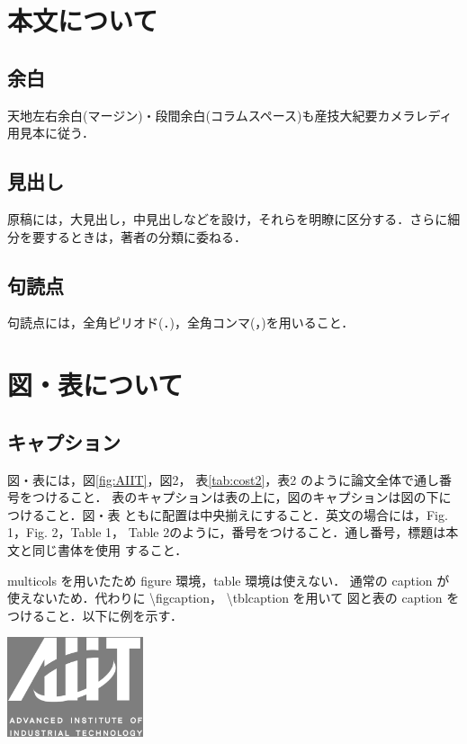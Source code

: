 \documentclass[a4j,twoside]{jarticle}
\begin{document}
\begin{multicols}{2}
\section{本文について}

\subsection{余白}
天地左右余白(マージン)・段間余白(コラムスペース)も産技大紀要カメラレディ用見本に従う．

\subsection{見出し}
原稿には，大見出し，中見出しなどを設け，それらを明瞭に区分する．さらに細分を要するときは，著者の分類に委ねる．

\subsection{句読点}
句読点には，全角ピリオド(．)，全角コンマ(，)を用いること．


\section{図・表について}
\subsection{キャプション}
図・表には，図\ref{fig:AIIT}，図2，
表\ref{tab:cost2}，表2 のように論文全体で通し番号をつけること．
表のキャプションは表の上に，図のキャプションは図の下につけること．図・表
ともに配置は中央揃えにすること．英文の場合には，Fig. 1，Fig. 2，Table 1，
Table 2のように，番号をつけること．通し番号，標題は本文と同じ書体を使用
すること．

multicols を用いたため figure 環境，table 環境は使えない．
通常の caption が使えないため．代わりに \textbackslash figcaption，
\textbackslash tblcaption を用いて
図と表の caption をつけること．以下に例を示す．

\begin{center}
\includegraphics[width=0.3\textwidth]{AIIT_Symbol.eps}
\label{fig:AIIT}
\end{center}


\end{multicols}
\end{document}
